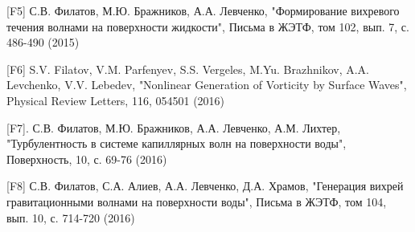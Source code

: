 [F5] С.В. Филатов, М.Ю. Бражников, А.А. Левченко, "Формирование вихревого течения волнами на поверхности жидкости"{}, Письма в ЖЭТФ, том 102, вып. 7, с. 486-490 (2015)

[F6] S.V. Filatov, V.M. Parfenyev, S.S. Vergeles, M.Yu. Brazhnikov, A.A. Levchenko, V.V. Lebedev, "Nonlinear Generation of Vorticity by Surface Waves"{}, Physical Review Letters, 116, 054501 (2016)

[F7]. С.В. Филатов, М.Ю. Бражников, А.А. Левченко,  А.М. Лихтер, "Турбулентность в системе капиллярных волн на поверхности воды"{}, Поверхность, 10, с. 69-76 (2016)

[F8] С.В. Филатов, С.А. Алиев, А.А. Левченко, Д.А. Храмов, "Генерация вихрей гравитационными волнами на поверхности воды"{}, Письма в ЖЭТФ, том 104, вып.  10, с. 714-720 (2016)

%
\clearpage 







